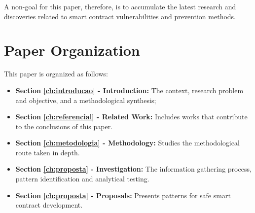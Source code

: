 A non-goal for this paper, therefore, is to accumulate the latest research and discoveries related to smart contract vulnerabilities and prevention methods.

\section{Paper Organization}

This paper is organized as follows:

\begin{itemize}

 \item \textbf{Section \ref{ch:introducao} - Introduction:} The context, research problem and objective, and a methodological synthesis;
 
    \item \textbf{Section \ref{ch:referencial} - Related Work:} Includes works that contribute to the conclusions of this paper.
    
    \item \textbf{Section \ref{ch:metodologia} - Methodology:} Studies the methodological route taken in depth.
       
       
    \item \textbf{Section \ref{ch:proposta} - Investigation:} The information gathering process, pattern identification and analytical testing.
       
       
    \item \textbf{Section \ref{ch:proposta} - Proposals:} Presents patterns for safe smart contract development.

\end{itemize}

